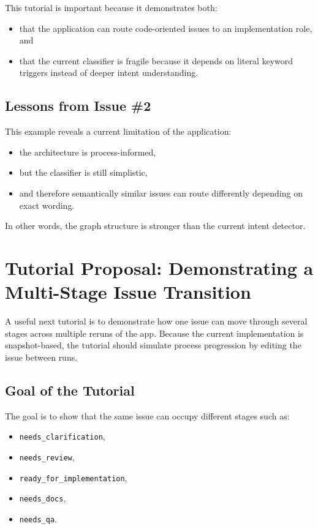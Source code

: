 \documentclass[11pt,a4paper]{article}
\begin{document}
This tutorial is important because it demonstrates both:
\begin{itemize}
    \item that the application can route code-oriented issues to an implementation role, and
    \item that the current classifier is fragile because it depends on literal keyword triggers instead of deeper intent understanding.
\end{itemize}

\subsection{Lessons from Issue \#2}

This example reveals a current limitation of the application:
\begin{itemize}
    \item the architecture is process-informed,
    \item but the classifier is still simplistic,
    \item and therefore semantically similar issues can route differently depending on exact wording.
\end{itemize}

In other words, the graph structure is stronger than the current intent detector.

\section{Tutorial Proposal: Demonstrating a Multi-Stage Issue Transition}

A useful next tutorial is to demonstrate how one issue can move through several stages across multiple reruns of the app. Because the current implementation is snapshot-based, the tutorial should simulate process progression by editing the issue between runs.

\subsection{Goal of the Tutorial}

The goal is to show that the same issue can occupy different stages such as:
\begin{itemize}
    \item \texttt{needs\_clarification},
    \item \texttt{needs\_review},
    \item \texttt{ready\_for\_implementation},
    \item \texttt{needs\_docs},
    \item \texttt{needs\_qa}.
\end{itemize}
\end{document}
